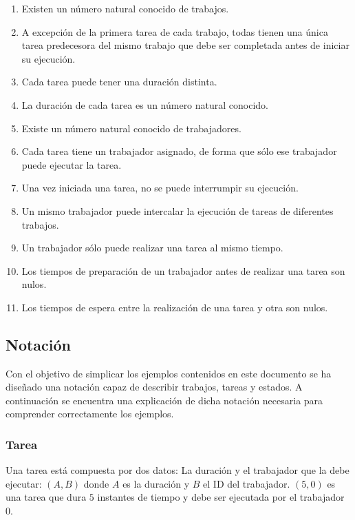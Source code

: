 \begin{enumerate}[start=0, itemsep=0.25px]
    \item Existen un número natural conocido de trabajos.
    \item A excepción de la primera tarea de cada trabajo,
    todas tienen una única tarea predecesora del mismo trabajo
    que debe ser completada antes de iniciar su ejecución.
    \item Cada tarea puede tener una duración distinta.
    \item La duración de cada tarea es un número natural conocido.
    \item Existe un número natural conocido de trabajadores.
    \item Cada tarea tiene un trabajador asignado,
    de forma que sólo ese trabajador puede ejecutar la tarea.
    \item Una vez iniciada una tarea, no se puede interrumpir su ejecución.
    \item Un mismo trabajador puede intercalar la ejecución de tareas de diferentes trabajos.
    \item Un trabajador sólo puede realizar una tarea al mismo tiempo.
    \item Los tiempos de preparación de un trabajador antes de realizar una tarea son nulos.
    \item Los tiempos de espera entre la realización de una tarea y otra son nulos.
\end{enumerate}

\subsection{Notación}

Con el objetivo de simplicar los ejemplos contenidos en este documento
se ha diseñado una notación capaz de describir trabajos, tareas y estados.
A continuación se encuentra una explicación de dicha notación
necesaria para comprender correctamente los ejemplos.

\subsubsection{Tarea}

Una tarea está compuesta por dos datos: La duración y el trabajador que la debe ejecutar:
$(A, B)$ donde $A$ es la duración y $B$ el ID del trabajador.
$(5, 0)$ es una tarea que dura $5$ instantes de tiempo y debe ser ejecutada por el
trabajador $0$.

